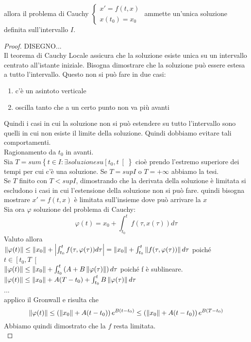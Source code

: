allora il problema di Cauchy $\left\{\begin{matrix} x'=f(t,x)\\x(t_0)=x_0\end{matrix}\right.$ ammette un'unica soluzione definita sull'intervallo $I$.
\begin{proof}
	DISEGNO...\\
	Il teorema di Cauchy Locale assicura che  la soluzione esiste unica su un intervallo centrato all'istante iniziale.
	Bisogna dimostrare che la soluzione può essere estesa a tutto l'intervallo. Questo non si può fare in due casi:
	\begin{enumerate}
		\item c'è un asintoto verticale
		\item oscilla tanto che a un certo punto non va più avanti
	\end{enumerate}
	Quindi i casi in cui la soluzione non si può estendere su tutto l'intervallo sono quelli in cui non esiste il limite della soluzione. Quindi dobbiamo evitare tali comportamenti.\\
	Ragionamento da $t_0$ in avanti.\\
	Sia $T=sum\left\{t\in I :\exists soluzione su \left[ t_0,t \right[ \right\}$ cioè prendo l'estremo superiore dei tempi per cui c'è una soluzione.
	Se $T= sup I$ o $T=+\infty$ abbiamo la tesi.\\
	Se $T$ finito con $T<sup I$, dimostrando che la derivata della soluzione è limitata si escludono i casi in cui l'estensione della soluzione non si può fare.
	quindi bisogna mostrare $ x' = f(t,x)$ è limitata sull'insieme dove può arrivare la $x$\\
	Sia ora $\varphi$ soluzione del problema di Cauchy:
	$$ \varphi(t) = x_0 + \int_{t_0}^tf(\tau,x(\tau))d\tau$$
	Valuto allora\\
	$\left\|\varphi(t)\right\|\le \left\|x_0\right\| + \left|\int_{t_0}^tf(\tau,\varphi(\tau))d\tau\right|=\left\|x_0\right\| + \int_{t_0}^t\left\|f(\tau,\varphi(\tau))\right\|d\tau$ poiché $t\in\left[t_0,T\right[$\\
	$\left\|\varphi(t)\right\|\le \left\|x_0\right\| + \int_{t_0}^t\left(A+B\left\|\varphi(\tau)\right\|\right)d\tau$ poiché f è sublineare.\\
	$\left\|\varphi(t)\right\|\le \left\|x_0\right\| + A(T-t_0)+\int_{t_0}^t B\left\|\varphi(\tau)\right\|d\tau$\\
	...\\
	applico il Gronwall e risulta che
	$$\left\|\varphi(t)\right\|\le\left(\left\|x_0\right\|+A(t-t_0)\right)e^{B(t-t_0)}\le\left(\left\|x_0\right\|+A(t-t_0)\right)e^{B(T-t_0)}$$	
	Abbiamo quindi dimostrato che la $f$ resta limitata.\\

\end{proof}
